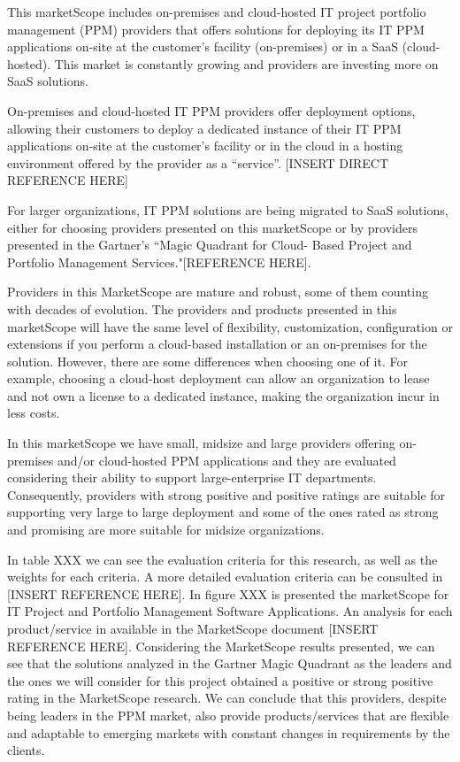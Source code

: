 This marketScope includes on-premises and cloud-hosted IT project portfolio management (PPM) providers that offers solutions for deploying its IT PPM applications on-site at the customer's facility (on-premises) or in a SaaS (cloud-hosted). This market is constantly growing and providers are investing more on SaaS solutions.\par
On-premises and cloud-hosted IT PPM providers offer deployment options, allowing their customers to deploy a dedicated instance of their IT PPM applications on-site at the customer's facility or in the cloud in a hosting environment offered by the provider as a ``service''. [INSERT DIRECT REFERENCE HERE]\par
For larger organizations, IT PPM solutions are being migrated to SaaS solutions, either for choosing providers presented on this marketScope or by providers presented in the Gartner's ``Magic Quadrant for Cloud- Based Project and Portfolio Management Services."[REFERENCE HERE].\par
Providers in this MarketScope are mature and robust, some of them counting with decades of evolution. The providers and products presented in this marketScope will have the same level of flexibility, customization, configuration or extensions if you perform a cloud-based installation or an on-premises for the solution. However, there are some differences when choosing one of it. For example, choosing a cloud-host deployment can allow an organization to lease and not own a license to a dedicated instance, making the organization incur in less costs.\par
In this marketScope we have small, midsize and large providers offering on-premises and/or cloud-hosted PPM applications and they are evaluated considering their ability to support large-enterprise IT departments. Consequently, providers with strong positive and positive ratings are suitable for supporting very large to large deployment and some of the ones rated as strong and promising are more suitable for midsize organizations.\par
In table XXX we can see the evaluation criteria for this research, as well as the weights for each criteria. A more detailed evaluation criteria can be consulted in [INSERT REFERENCE HERE]. In figure XXX is presented the marketScope for IT Project and Portfolio Management Software Applications. An analysis for each product/service in available in the MarketScope document [INSERT REFERENCE HERE].
Considering the MarketScope results presented, we can see that the solutions analyzed in the Gartner Magic Quadrant as the leaders and the ones we will consider for this project obtained a positive or strong positive rating in the MarketScope research. We can conclude that this providers, despite being leaders in the PPM market, also provide products/services that are flexible and adaptable to emerging markets with constant changes in requirements by the clients.


